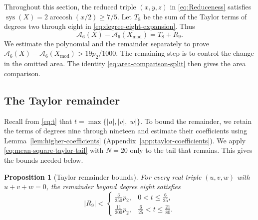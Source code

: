 \documentclass[10pt,twoside]{article}
\theoremstyle{plain}
\newtheorem{proposition}[theorem]{Proposition}
\theoremstyle{definition}
\theoremstyle{remark}
\DeclareMathOperator{\arccosh}{arccosh}
\DeclareMathOperator{\sys}{sys}
\newcommand{\A}{\mathcal A}
\newcommand{\Xmod}{X_{\mathrm{mod}}}
\begin{document}
Throughout this section, the reduced triple $(x,y,z)$ in
\eqref{eq:Reduceness} satisfies $\sys(X)=2\arccosh(x/2)\geq7/5$.
Let $T_8$ be the sum of the
Taylor terms of degrees two through eight in
\eqref{eq:degree-eight-expansion}. Thus
\begin{equation}
\label{eq:polynomial-remainder-split}
\A_6(X)-\A_6(\Xmod)=T_8+R_9.
\end{equation}
We estimate the polynomial and the remainder separately to prove $
\A_6(X)-\A_6(\Xmod)>{19}p_2/{1000}
$.
The remaining step is to control the change in the omitted area.
The identity \eqref{eq:area-comparison-split} then gives the area comparison.

\subsection{The Taylor remainder}
\label{sec:global-remainder-completion}
Recall from \eqref{eq:t} that $t=\max\{|u|,|v|,|w|\}$.
To bound the remainder, we retain the terms of degrees nine through
nineteen and estimate their coefficients using
Lemma~\ref{lem:higher-coefficients}
(Appendix~\ref{app:taylor-coefficients}). We apply
\eqref{eq:mean-square-taylor-tail} with $N=20$ only to the tail that
remains. This gives the bounds needed below.

\begin{proposition}[Taylor remainder bounds]
\label{thm:global-taylor-remainder}
For every real triple $(u,v,w)$ with $u+v+w=0$, the remainder
beyond degree eight satisfies
$$
|R_9|<
\begin{cases}
\frac3{250}p_2,&0<t\leq\frac6{25},\\
\frac{11}{200}p_2,&\frac6{25}<t\leq\frac{21}{80}.
\end{cases}
$$
\end{proposition}
\end{document}
